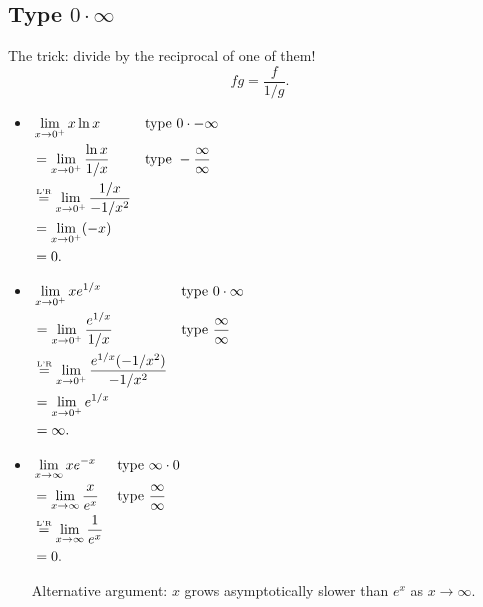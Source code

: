 \subsection*{Type $ 0\cdot \infty$}
The trick: divide by the reciprocal of one of them!
\[ fg=\frac{f}{1/g}. \]
\begin{Example}{}{}
    \begin{itemize}
        \item $\begin{aligned}[t]
                       & \lim\limits_{{x} \to {0^+}}x\ln x                  &  & \text{type }0\cdot -\infty         \\
                       & =\lim\limits_{{x} \to {0^+}}\frac{\ln x}{1/x}      &  & \text{type }-\frac{\infty}{\infty} \\
                       & \stackrel{\text{\tiny L'R}}{=} \lim\limits_{{x} \to {0^+}}\frac{1/x}{-1/x^2}                                         \\
                       & =\lim\limits_{{x} \to {0^+}}(-x)                                                           \\
                       & =0.
                  \end{aligned}$
        \item $\begin{aligned}[t]
                       & \lim\limits_{{x} \to {0^+}}x e^{1/x}                          &  & \text{type }0\cdot \infty         \\
                       & =\lim\limits_{{x} \to {0^+}}\frac{e^{1/x}}{1/x}               &  & \text{type }\frac{\infty}{\infty} \\
                       & \stackrel{\text{\tiny L'R}}{=}\lim\limits_{{x} \to {0^+}}\frac{e^{1/x}(-1/x^2)}{-1/x^2}                                        \\
                       & =\lim\limits_{{x} \to {0^+}}e^{1/x}                                                                  \\
                       & =\infty.
                  \end{aligned}$
        \item $\begin{aligned}[t]
                       & \lim\limits_{{x} \to {\infty}}x e^{-x}            &  & \text{type }\infty\cdot 0         \\
                       & =\lim\limits_{{x} \to {\infty}}\frac{x}{e^{x}}    &  & \text{type }\frac{\infty}{\infty} \\
                       & \stackrel{\text{\tiny L'R}}{=}\lim\limits_{{x} \to {\infty}}\frac{1}{e^{x}}                                        \\
                       & =0.
                  \end{aligned}$

              Alternative argument: $ x $ grows asymptotically slower than $ e^x $ as $ x\to\infty $.
    \end{itemize}
\end{Example}
